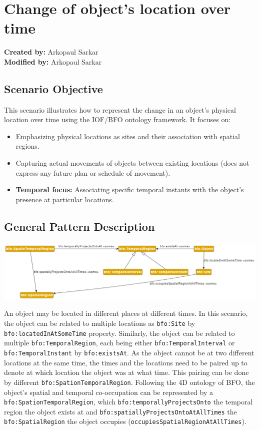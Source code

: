 \section{Change of object's location over time}
\label{sec-change-location}

\textbf{Created by:} Arkopaul Sarkar \\
\textbf{Modified by:} Arkopaul Sarkar \\

\subsection*{Scenario Objective}

This scenario illustrates how to represent the change in an object's physical location over time using the IOF/BFO ontology framework. It focuses on:
\begin{itemize}
    \item Emphasizing physical locations as sites and their association with spatial regions.
    \item Capturing actual movements of objects between existing locations (does not express any future plan or schedule of movement).
    \item \textbf{Temporal focus:} Associating specific temporal instants with the object's presence at particular locations.
\end{itemize}

\subsection*{General Pattern Description}
\includegraphics[scale=0.38]{scenarios/location-change/images/change-location-general.png}

An object may be located in different places at different times. In this scenario, the object can be related to multiple locations as \texttt{bfo:Site} by \texttt{bfo:locatedInAtSomeTime} property. Similarly, the object can be related to multiple \texttt{bfo:TemporalRegion}, each being either \texttt{bfo:TemporalInterval} or \texttt{bfo:TemporalInstant} by \texttt{bfo:existsAt}. As the object cannot be at two different locations at the same time, the times and the locations need to be paired up to denote at which location the object was at what time. This pairing can be done by different \texttt{bfo:SpationTemporalRegion}. Following the 4D ontology of BFO, the object's spatial and temporal co-occupation can be represented by a \texttt{bfo:SpationTemporalRegion}, which \texttt{bfo:temporallyProjectsOnto} the temporal region the object exists at and \texttt{bfo:spatiallyProjectsOntoAtAllTimes} the \texttt{bfo:SpatialRegion} the object occupies (\texttt{occupiesSpatialRegionAtAllTimes}). 


